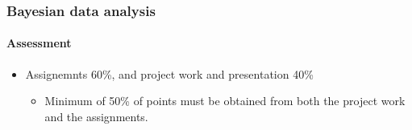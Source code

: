 \documentclass[english,t]{beamer}
\begin{document}

  


  

  


\begin{frame}
  \frametitle{Bayesian data analysis}  %
  \framesubtitle{Assessment}
  \begin{itemize}
  \item Assignemnts 60\%, and project work and presentation 40\%
     \begin{itemize}
     \item Minimum of 50\% of points must be obtained from both the project work and the assignments.
     \end{itemize}
  \end{itemize}

\end{frame}
\end{document}
